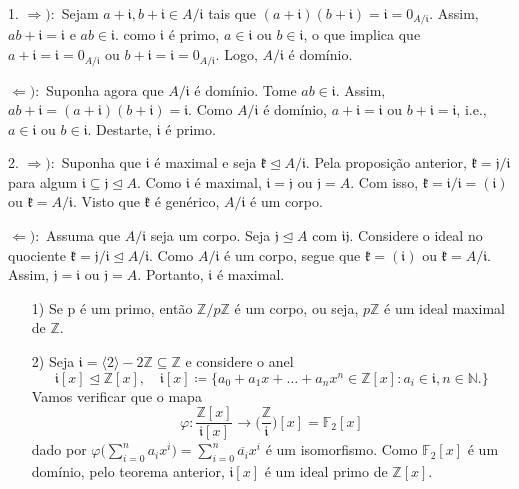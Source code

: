\documentclass[AlgebraII/algebraII_notes.tex]{subfiles}
\begin{document}
\begin{proof*}
	1. \(\Rightarrow ):\) Sejam \(a+\mathfrak{i}, b+\mathfrak{i}\in A/\mathfrak{i}\) tais que \((a+\mathfrak{i})(b+\mathfrak{i})=\mathfrak{i}=0_{A/\mathfrak{i}}.\) Assim,
	\(ab+\mathfrak{i} = \mathfrak{i}\) e \(ab\in \mathfrak{i}.\) como \(\mathfrak{i}\) é primo, \(a\in \mathfrak{i}\) ou \(b\in \mathfrak{i}\), o que implica que
	\(a+\mathfrak{i} = \mathfrak{i} = 0_{A/\mathfrak{i}}\) ou \(b+\mathfrak{i} = \mathfrak{i} = 0_{A/\mathfrak{i}}.\) Logo, \(A/\mathfrak{i}\) é domínio.

	\(\Leftarrow ):\) Suponha agora que \(A/\mathfrak{i}\) é domínio. Tome \(ab\in \mathfrak{i}\). Assim, \(ab + \mathfrak{i} = (a+\mathfrak{i})(b+\mathfrak{i}) = \mathfrak{i}.\)
	Como \(A/\mathfrak{i}\) é domínio, \(a+\mathfrak{i} = \mathfrak{i}\) ou \(b+\mathfrak{i} = \mathfrak{i}\), i.e., \(a\in \mathfrak{i}\) ou \(b\in \mathfrak{i}.\) Destarte, \(\mathfrak{i}\) é primo.

	2. \(\Rightarrow ):\) Suponha que \(\mathfrak{i}\) é maximal e seja \(\mathfrak{k}\trianglelefteq{A/\mathfrak{i}}.\) Pela proposição anterior,
	\(\mathfrak{k} = \mathfrak{j}/\mathfrak{i}\) para algum \(\mathfrak{i}\subseteq \mathfrak{j}\trianglelefteq{A}.\) Como \(\mathfrak{i}\) é maximal,
	\(\mathfrak{i}=\mathfrak{j}\) ou \(\mathfrak{j} = A.\) Com isso, \(\mathfrak{k} = \mathfrak{i}/\mathfrak{i} = (\mathfrak{i})\) ou \(\mathfrak{k} = A/\mathfrak{i}.\)
	Visto que \(\mathfrak{k}\) é genérico, \(A/\mathfrak{i}\) é um corpo.

	\(\Leftarrow ):\) Assuma que \(A/\mathfrak{i}\) seja um corpo. Seja \(\mathfrak{j}\trianglelefteq{A}\) com \(\mathfrak{i}\mathfrak{j}\).
	Considere o ideal no quociente \(\mathfrak{k} = \mathfrak{j}/\mathfrak{i}\trianglelefteq{A/\mathfrak{i}}\). Como \(A/\mathfrak{i}\) é um corpo,
	segue que \(\mathfrak{k} = (\mathfrak{i})\) ou \(\mathfrak{k} = A/\mathfrak{i}.\) Assim, \(\mathfrak{j} = \mathfrak{i}\) ou \(\mathfrak{j} = A.\)
	Portanto, \(\mathfrak{i}\) é maximal. \qedsymbol
\end{proof*}
\begin{example}
	\begin{itemize}
		\item[1)] Se p é um primo, então \(\mathbb{Z}/p \mathbb{Z}\) é um corpo, ou seja, \(p \mathbb{Z}\) é um ideal maximal de \(\mathbb{Z}.\)
		\item[2)] Seja \(\mathfrak{i} = \langle 2 \rangle - 2 \mathbb{Z}\subseteq \mathbb{Z}\) e considere o anel
		      \[
			      \mathfrak{i}[x] \trianglelefteq \mathbb{Z}[x],\quad  \mathfrak{i}[x]\coloneqq \{a_{0}+a_{1}x+\dotsc +a_{n}x^{n}\in \mathbb{Z}[x]: a_{i}\in \mathfrak{i}, n\in \mathbb{N}.\}
		      \]
		      Vamos verificar que o mapa
		      \[
			      \varphi : \frac{\mathbb{Z}[x]}{\mathfrak{i}[x]}\rightarrow \biggl(\frac{\mathbb{Z}}{\mathfrak{i}}\biggr)[x] = \mathbb{F}_{2}[x]
		      \]
		      dado por \(\varphi \biggl(\sum\limits_{i=0}^{n}a_{i}x^{i}\biggr) = \sum\limits_{i=0}^{n}\overline{a_{i}}x^{i}\) é um isomorfismo. Como \(\mathbb{F}_{2}[x]\) é um domínio,
		      pelo teorema anterior, \(\mathfrak{i}[x]\) é um ideal primo de \(\mathbb{Z}[x]\).
	\end{itemize}
\end{example}
\end{document}
